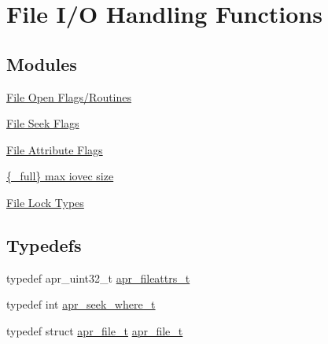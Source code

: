 \hypertarget{group__apr__file__io}{}\section{File I/O Handling Functions}
\label{group__apr__file__io}
\subsection*{Modules}
\begin{DoxyCompactItemize}
\item 
\hyperlink{group__apr__file__open__flags}{File Open Flags/\+Routines}
\item 
\hyperlink{group__apr__file__seek__flags}{File Seek Flags}
\item 
\hyperlink{group__apr__file__attrs__set__flags}{File Attribute Flags}
\item 
\hyperlink{group__apr__file__writev}{\{\+\_\+full\} max iovec size}
\item 
\hyperlink{group__apr__file__lock__types}{File Lock Types}
\end{DoxyCompactItemize}
\subsection*{Typedefs}
\begin{DoxyCompactItemize}
\item 
typedef apr\+\_\+uint32\+\_\+t \hyperlink{group__apr__file__io_ga11fbee5a7a3f3d45fff5c31df0db9737}{apr\+\_\+fileattrs\+\_\+t}
\item 
typedef int \hyperlink{group__apr__file__io_ga8eecd44975906042e0e369771802a145}{apr\+\_\+seek\+\_\+where\+\_\+t}
\item 
typedef struct \hyperlink{group__apr__file__io_gaa46e4763ac375ea3c7a43ba6f6099e22}{apr\+\_\+file\+\_\+t} \hyperlink{group__apr__file__io_gaa46e4763ac375ea3c7a43ba6f6099e22}{apr\+\_\+file\+\_\+t}
\end{DoxyCompactItemize}
